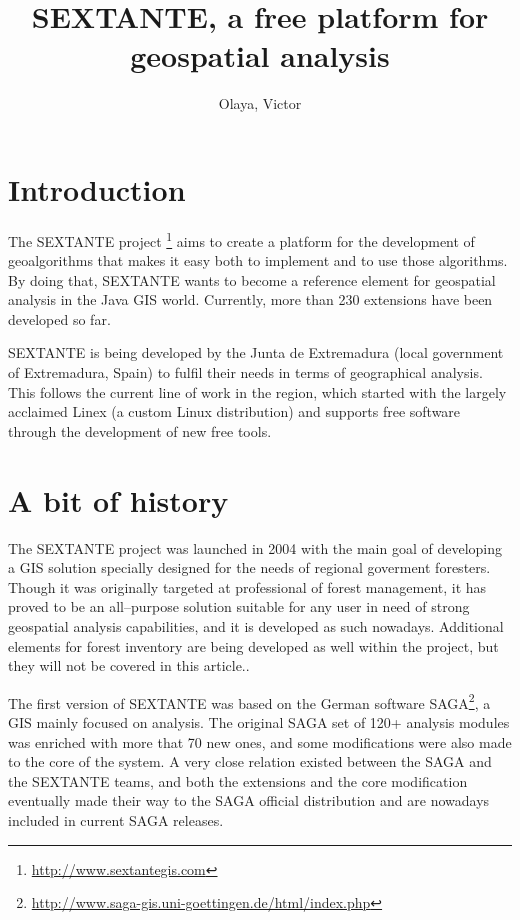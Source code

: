 \documentclass[12pt,a4paper,twocolumn]{article}
\title{SEXTANTE, a free platform for geospatial analysis}
\author{Olaya, Victor}
\newcommand{\footurl}[1]{\footnote{\url{#1}}}
\begin{document}
\maketitle

\section{Introduction}

The SEXTANTE project \footurl{http://www.sextantegis.com} aims to create a platform for the development of geoalgorithms that makes it easy both to implement and to use those algorithms. By doing that, SEXTANTE wants to become a reference element for geospatial analysis in the Java GIS world. Currently, more than 230 extensions have been developed so far. 

SEXTANTE is being developed by the Junta de Extremadura (local government of Extremadura, Spain) to fulfil their needs in terms of geographical analysis. This follows the current line of work in the region, which started with the largely acclaimed Linex (a custom Linux distribution) and supports free software through the development of new free tools.

\section{A bit of history}

The SEXTANTE project was launched in 2004 with the main goal of developing a GIS solution specially designed for the needs of regional goverment foresters. Though it was originally targeted at professional of forest management, it has proved to be an all--purpose solution suitable for any user in need of strong geospatial analysis capabilities, and it is developed as such nowadays. Additional elements for forest inventory are being developed as well within the project, but they will not be covered in this article..

The first version of SEXTANTE was based on the German software SAGA\footurl{http://www.saga-gis.uni-goettingen.de/html/index.php}, a GIS mainly focused on analysis. The original SAGA set of 120+ analysis modules was enriched with more that 70 new ones, and some modifications were also made to the core of the system. A very close relation existed between the SAGA and the SEXTANTE teams, and both the extensions and the core modification eventually made their way to the SAGA official distribution and are nowadays included in current SAGA releases. 
\end{document}
